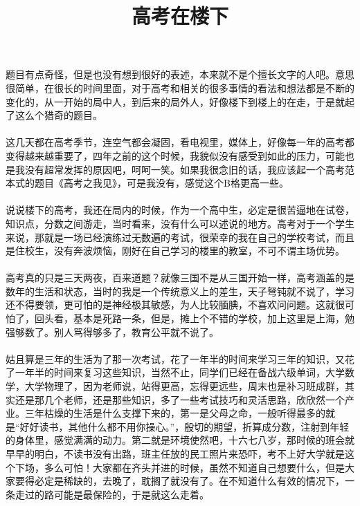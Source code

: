 \documentclass[UTF8]{ctexart}
\title{高考在楼下}
\begin{document}
 

\maketitle
      \tableofcontents   

          \section{}
          \paragraph{}题目有点奇怪，但是也没有想到很好的表述，本来就不是个擅长文字的人吧。意思很简单，在很长的时间里面，对于高考和相关的很多事情的看法和想法都是不断的变化的，从一开始的局中人，到后来的局外人，好像楼下到楼上的在走，于是就起了这么个猎奇的题目。
          \paragraph{}这几天都在高考季节，连空气都会凝固，看电视里，媒体上，好像每一年的高考都变得越来越重要了，四年之前的这个时候，我貌似没有感受到如此的压力，可能也是我没有超常发挥的原因吧，呵呵一笑。如果我很念旧的话，我应该起一个高考范本式的题目《高考之我见》，可是我没有，感觉这个B格更高一些。
          \paragraph{}说说楼下的高考，我还在局内的时候，作为一个高中生，必定是很苦逼地在试卷，知识点，分数之间游走，当时看来，没有什么可以述说的地方。高考对于一个学生来说，那就是一场已经演练过无数遍的考试，很荣幸的我在自己的学校考试，而且是住校生，没有奔波烦恼，刚好在自己学习的楼里的教室，不可不谓主场优势。
          \paragraph{}高考真的只是三天两夜，百来道题？就像三国不是从三国开始一样，高考涵盖的是数年的生活和状态，当时的我是一个传统意义上的差生，天子弩钝就不说了，学习还不得要领，更可怕的是神经极其敏感，为人比较腼腆，不喜欢问问题。这就很可怕了，回头看，基本是死路一条，但是，摊上个不错的学校，加上这里是上海，勉强够数了。别人骂得够多了，教育公平就不说了。
          \paragraph{}姑且算是三年的生活为了那一次考试，花了一年半的时间来学习三年的知识，又花了一年半的时间来复习这些知识，当然不止，同学们已经在备战六级单词，大学数学，大学物理了，因为老师说，站得更高，忘得更远些，周末也是补习班成群，其实还是那几个老师，还是那些知识，多了一些考试技巧和灵活思路，欣欣然一个产业。三年枯燥的生活是什么支撑下来的，第一是父母之命，一般听得最多的就是“好好读书，其他什么都不用你操心。”，殷切的期望，折算成分数，注射到年轻的身体里，感觉满满的动力。第二就是环境使然吧，十六七八岁，那时候的班会就早早的明白，不读书没有出路，班主任放的民工照片来恐吓，考不上好大学就是这个下场，多么可怕！大家都在齐头并进的时候，虽然不知道自己想要什么，但是大家要得必定是稀缺的，去晚了，耽搁了就没有了。在不知道什么有效的情况下，一条走过的路可能是最保险的，于是就这么走着。
\end{document}
